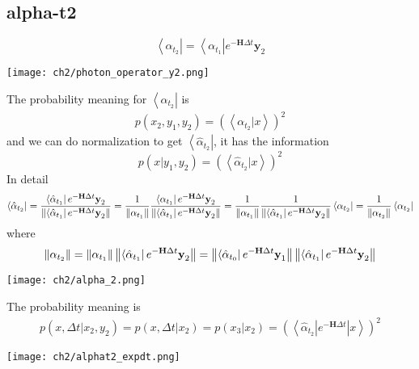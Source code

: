 \subsection{alpha-t2}
\begin{definition}
\begin{equation}
        \left< \alpha_{t_2} \right| = \left< \alpha_{t_1} \right| e^{-\textbf{H}\Delta t} \textbf{y}_2     
\end{equation}
\begin{center}
        \texttt{[image: ch2/photon\_operator\_y2.png]}   
\end{center}
The probability meaning for $\left< \alpha_{t_2}\right|$ is 
\begin{align*}
        p(x_2, y_1, y_2) = (\left< \alpha_{t_2}| x \right>)^2
\end{align*}
and we can do normalization to get $\left< \hat{\alpha}_{t_2} \right|$, it has the information
\begin{equation}
        p(x|y_1,y_2) = (\left< \hat{\alpha}_{t_2} |x\right>)^2
\end{equation}
In detail
\begin{equation}
        \left< \hat{\alpha}_{t_2} \right| 
	= \frac{\left< \hat{\alpha}_{t_1} \right| e^{-\textbf{H}\Delta t} \textbf{y}_2}{\left\lVert\left< \hat{\alpha}_{t_1} \right| e^{-\textbf{H}\Delta t} \textbf{y}_2\right\rVert} 
	= \frac{1}{\left\lVert\alpha_{t_{1}}\right\rVert} \frac{\left< \alpha_{t_1} \right| e^{-\textbf{H}\Delta t} \textbf{y}_2}{\left\lVert\left< \hat{\alpha}_{t_1} \right| e^{-\textbf{H}\Delta t} \textbf{y}_2\right\rVert} 
	= \frac{1}{\left\lVert\alpha_{t_{1}}\right\rVert} \frac{1}{\left\lVert\left< \hat{\alpha}_{t_1} \right| e^{-\textbf{H}\Delta t} \textbf{y}_2\right\rVert} \left< \alpha_{t_2} \right| 
	= \frac{1}{\left\lVert\alpha_{t_2}\right\rVert} \left< \alpha_{t_2} \right|
\end{equation}
where
\begin{equation}
        \left\lVert\alpha_{t_2}\right\rVert = \left\lVert\alpha_{t_{1}}\right\rVert \left\lVert\left< \hat{\alpha}_{t_1} \right| e^{-\textbf{H}\Delta t} \textbf{y}_2\right\rVert 
	= \left\lVert\left < \hat{\alpha}_{t_{0}} \right| e^{-\textbf{H}\Delta t} \textbf{y}_1\right\rVert \left\lVert\left< \hat{\alpha}_{t_1} \right| e^{-\textbf{H}\Delta t} \textbf{y}_2\right\rVert
\end{equation}
\begin{center}
        \texttt{[image: ch2/alpha\_2.png]}   
\end{center}
\end{definition}

\begin{definition}
The probability meaning is 
\begin{align*}
        p(x, \Delta t | x_2, y_2) = p(x, \Delta t | x_2) = p(x_3|x_2) = (\left< \hat{\alpha}_{t_2}| e^{-\textbf{H}\Delta t} | x \right>)^2
\end{align*}
\begin{center}
        \texttt{[image: ch2/alphat2\_expdt.png]}   
\end{center}
\end{definition}

